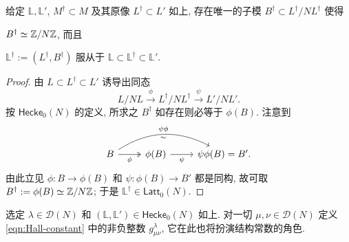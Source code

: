 \begin{lemma}\label{prop:canonical-level-structure}
	给定 $\mathbb{L}, \mathbb{L}'$, $M^\dagger \subset M$ 及其原像 $L^\dagger \subset L'$ 如上, 存在唯一的子模 $B^\dagger \subset L^\dagger /NL^\dagger$ 使得
	\begin{inparaenum}[(i)]
		\item $B^\dagger \simeq \mathbb{Z}/N\mathbb{Z}$, 而且
		\item $\mathbb{L}^\dagger := (L^\dagger, B^\dagger)$ 服从于 $\mathbb{L} \subset \mathbb{L}^\dagger \subset \mathbb{L}'$.
	\end{inparaenum}
\end{lemma}
\begin{proof}
	由 $L \subset L^\dagger \subset L'$ 诱导出同态
	\[ L/NL \xrightarrow{\phi} L^\dagger/NL^\dagger \xrightarrow{\psi} L'/NL'. \]
	按 $\mathsf{Hecke}_0(N)$ 的定义, 所求之 $B^\dagger$ 如存在则必等于 $\phi(B)$. 注意到
	\[\begin{tikzcd}
		B \arrow[twoheadrightarrow, r, "\phi"'] \arrow[rr, bend left, "\psi\phi", "\sim"'] & \phi(B) \arrow[r, "\psi"'] & \psi\phi(B) = B'.
	\end{tikzcd}\]
	由此立见 $\phi: B \to \phi(B)$ 和 $\psi: \phi(B) \to B'$ 都是同构, 故可取 $B^\dagger := \phi(B) \simeq \mathbb{Z}/N\mathbb{Z}$; 于是 $\mathbb{L}^\dagger \in \mathsf{Latt}_0(N)$.
\end{proof}

选定 $\lambda \in \mathcal{D}(N)$ 和 $(\mathbb{L}, \mathbb{L}') \in \mathsf{Hecke}_0(N)$ 如上. 对一切 $\mu, \nu \in \mathcal{D}(N)$ 定义 \eqref{eqn:Hall-constant} 中的非负整数 $g^\lambda_{\mu\nu}$, 它在此也将扮演结构常数的角色.

